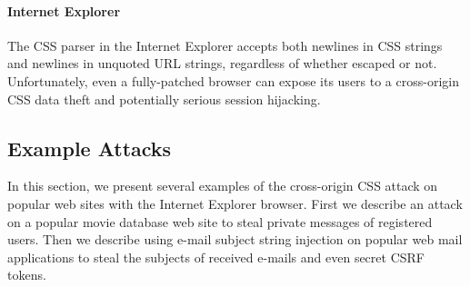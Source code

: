 \documentclass{acm_proc_article-sp}
\begin{document}
\paragraph{Internet Explorer}
The CSS parser in the Internet Explorer accepts both newlines in CSS strings and newlines in unquoted URL strings, regardless of whether escaped or not. Unfortunately, even a fully-patched browser can expose its users to a cross-origin CSS data theft and potentially serious session hijacking.

\subsection{Example Attacks}
In this section, we present several examples of the cross-origin CSS attack on popular web sites with the Internet Explorer browser. First we describe an attack on a popular movie database web site to steal private messages of registered users. Then we describe using e-mail subject string injection on popular web mail applications to steal the subjects of received e-mails and even secret CSRF tokens.
\end{document}
